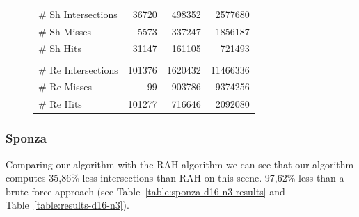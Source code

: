 \begin{figure}[!htb]
\begin{minipage}{0.725\linewidth}
\begin{tabular}[h]{l|rrr}
            \quad \# Sh Intersections       & 36720		& 498352	& 2577680	\\
            \quad \# Sh Misses              & 5573		& 337247	& 1856187	\\
            \quad \# Sh Hits                & 31147		& 161105	& 721493	\\
            & & \\
            \quad \# Re Intersections       & 101376	& 1620432	& 11466336	\\
            \quad \# Re Misses              & 99	    & 903786	& 9374256	\\
            \quad \# Re Hits                & 101277	& 716646	& 2092080	\\            
        \end{tabular}
        \label{table:cornell-d16-n3-results}
    \end{minipage}
\end{figure}

\subsubsection{Sponza}


Comparing our algorithm with the RAH algorithm we can see that our algorithm computes 35,86\% less intersections than RAH on this scene. 97,62\% less than a brute force approach (see Table~\ref{table:sponza-d16-n3-results} and Table~\ref{table:results-d16-n3}).



